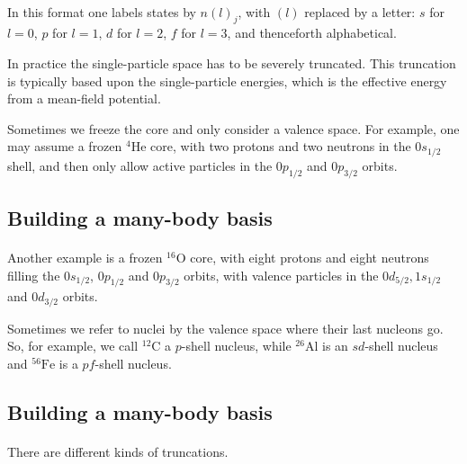 \documentclass[%
twoside,                 %
final,                   %
10pt]{article}
\begin{document}
\paragraph{}
In this format one labels states by $n(l)_j$, with $(l)$ replaced by a letter:
$s$ for $l=0$, $p$ for $l=1$, $d$ for $l=2$, $f$ for $l=3$, and thenceforth alphabetical.


 In practice the single-particle space has to be severely truncated.  This truncation is 
typically based upon the single-particle energies, which is the effective energy 
from a mean-field potential. 

Sometimes we freeze the core and only consider a valence space. For example, one 
may assume a frozen ${}^{4}\mbox{He}$ core, with two protons and two neutrons in the $0s_{1/2}$ 
shell, and then only allow active particles in the $0p_{1/2}$ and $0p_{3/2}$ orbits.



\subsection*{Building a many-body basis}

\paragraph{}

Another example is a frozen ${}^{16}\mbox{O}$ core, with eight protons and eight neutrons filling the 
$0s_{1/2}$,  $0p_{1/2}$ and $0p_{3/2}$ orbits, with valence particles in the 
$0d_{5/2}, 1s_{1/2}$ and $0d_{3/2}$ orbits.


Sometimes we refer to nuclei by the valence space where their last nucleons go.  
So, for example, we call ${}^{12}\mbox{C}$ a $p$-shell nucleus, while ${}^{26}\mbox{Al}$ is an 
$sd$-shell nucleus and ${}^{56}\mbox{Fe}$ is a $pf$-shell nucleus.





\subsection*{Building a many-body basis}

\paragraph{}
There are different kinds of truncations.
\end{document}
